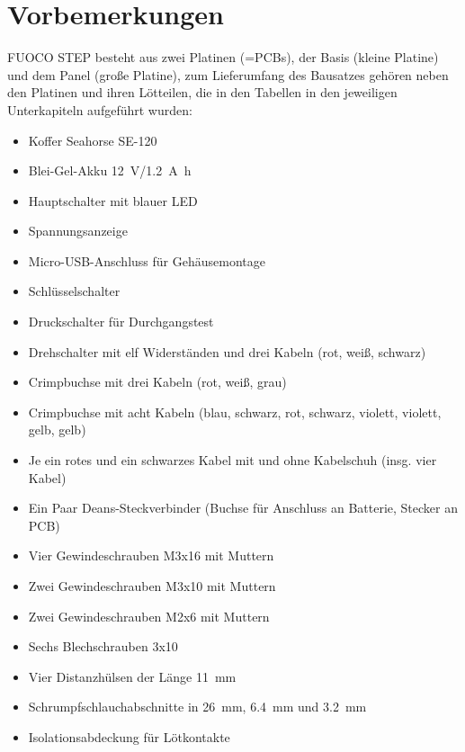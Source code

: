 \documentclass[paper=a4, open=any]{scrbook}
\begin{document}
	\chapter{Vorbemerkungen}
		FUOCO STEP besteht aus zwei Platinen (=PCBs), der Basis (kleine Platine) und dem Panel (große Platine), zum Lieferumfang des Bausatzes gehören neben den Platinen und ihren Lötteilen, die in den Tabellen in den jeweiligen Unterkapiteln aufgeführt wurden:
		\begin{itemize}
			\item Koffer Seahorse SE-120
			\item Blei-Gel-Akku \SI{12}{\volt}/\SI{1,2}{\ampere\hour}
			\item Hauptschalter mit blauer LED
			\item Spannungsanzeige
			\item Micro-USB-Anschluss für Gehäusemontage
			\item Schlüsselschalter
			\item Druckschalter für Durchgangstest
			\item Drehschalter mit elf Widerständen und drei Kabeln (rot, weiß, schwarz)
			\item Crimpbuchse mit drei Kabeln (rot, weiß, grau)
			\item Crimpbuchse mit acht Kabeln (blau, schwarz, rot, schwarz, violett, violett, gelb, gelb)
			\item Je ein rotes und ein schwarzes Kabel mit und ohne Kabelschuh (insg. vier Kabel)
			\item Ein Paar Deans-Steckverbinder (Buchse für Anschluss an Batterie, Stecker an PCB)
			\item Vier Gewindeschrauben M3x16 mit Muttern
			\item Zwei Gewindeschrauben M3x10 mit Muttern
			\item Zwei Gewindeschrauben M2x6 mit Muttern
			\item Sechs Blechschrauben 3x10
			\item Vier Distanzhülsen der Länge \SI{11}{\milli\metre}
			\item Schrumpfschlauchabschnitte in \SI{26}{\milli\metre}, \SI{6,4}{\milli\metre} und \SI{3,2}{\milli\metre}
			\item Isolationsabdeckung für Lötkontakte
		\end{itemize}
\end{document}
